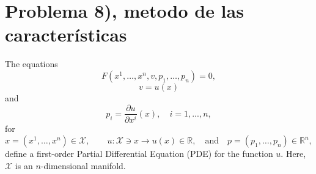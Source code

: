 \documentclass[11pt,spanish]{article}
\newcommand{\RR}{\mathbb{R}}
\begin{document}
\section{Problema 8), metodo de las caracter\'isticas}




The equations
\begin{equation}
\label{eq:UU1}
F(x^1,\dots,x^n,v,p_1,\dots,p_n)=0,
\end{equation}
$$
v=u(x)
$$
and
$$
p_i=\frac{\partial u}{\partial x^i}(x),
\quad
i=1,...,n,
$$
for
$$
x=(x^1,\dots,x^n)\in\mathcal X,
\qquad
u:\mathcal X\ni x\to u(x)\in \RR,
\quad
\text{and}
\quad
p=(p_1,\ldots,p_n)\in \RR^n,
$$
define a first-order Partial Differential Equation (PDE) for the function $u$.
Here, $\mathcal X$ is an $n$-dimensional manifold.
\end{document}
